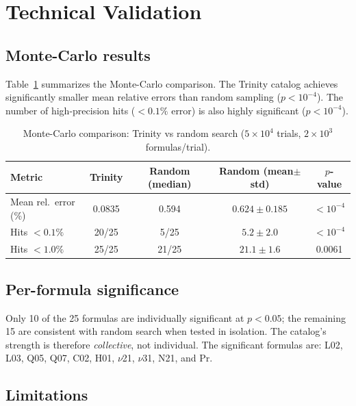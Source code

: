 \documentclass[11pt,a4paper]{article}
\begin{document}
\section{Technical Validation}
\label{sec:validation}

\subsection{Monte-Carlo results}

Table~\ref{tab:mc} summarizes the Monte-Carlo comparison.  The Trinity
catalog achieves significantly smaller mean relative errors than random
sampling ($p<10^{-4}$).  The number of high-precision hits ($<0.1\%$
error) is also highly significant ($p<10^{-4}$).

\begin{table}[h]
\centering
\caption{Monte-Carlo comparison: Trinity vs random search
  ($5\times10^{4}$ trials, $2\times10^{3}$ formulas/trial).}
\label{tab:mc}
\begin{tabular}{lcccc}
\toprule
Metric & Trinity & Random (median) & Random (mean$\pm$std) & $p$-value \\
\midrule
Mean rel.\ error (\%) & 0.0835 & 0.594 & $0.624\pm0.185$ & $<10^{-4}$ \\
Hits $<0.1\%$ & 20/25 & 5/25 & $5.2\pm2.0$ & $<10^{-4}$ \\
Hits $<1.0\%$ & 25/25 & 21/25 & $21.1\pm1.6$ & 0.0061 \\
\bottomrule
\end{tabular}
\end{table}

\subsection{Per-formula significance}

Only 10 of the 25 formulas are individually significant at $p<0.05$;
the remaining 15 are consistent with random search when tested in
isolation.  The catalog's strength is therefore \emph{collective}, not
individual.  The significant formulas are: L02, L03, Q05, Q07, C02, H01,
$\nu$21, $\nu$31, N21, and Pr.

\subsection{Limitations}
\end{document}
